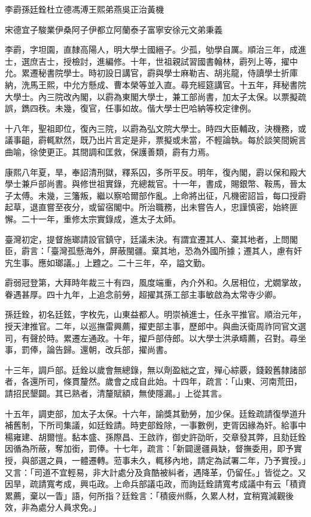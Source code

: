 
\begin{pinyinscope}
李霨孫廷銓杜立德馮溥王熙弟燕吳正治黃機

宋德宜子駿業伊桑阿子伊都立阿蘭泰子富寧安徐元文弟秉義

李霨，字坦園，直隸高陽人，明大學士國縉子。少孤，劬學自厲。順治三年，成進士，選庶吉士，授檢討，進編修。十年，世祖親試習國書翰林，霨列上等，擢中允。累遷秘書院學士。時初設日講官，霨與學士麻勒吉、胡兆龍，侍讀學士折庫納，洗馬王熙，中允方懸成、曹本榮等並入直。尋充經筵講官。十五年，拜秘書院大學士。內三院改內閣，以霨為東閣大學士，兼工部尚書，加太子太保。以票擬疏誤，鐫四秩。未幾，復官，任事如故。偕大學士巴哈納等校定律例。

十八年，聖祖即位，復內三院，以霨為弘文院大學士。時四大臣輔政，決機務，或議事齟，霨輒默然，既乃出片言定是非，票擬或未當，不輕論執。每於談笑間婉言曲喻，徐使更正。其間調和匡救，保護善類，霨有力焉。

康熙八年夏，旱，奉詔清刑獄，釋系囚，多所平反。明年，復內閣，霨以保和殿大學士兼戶部尚書。與修世祖實錄，充總裁官。十一年，書成，賜銀幣、鞍馬，晉太子太傅。未幾，三籓叛，繼以察哈爾部作亂。上命將出征，凡機密詔旨，每口授霨起草，退直嘗至夜分，或留宿閣中。所治職務，出未嘗告人，忠謹慎密，始終匪懈。二十一年，重修太宗實錄成，進太子太師。

臺灣初定，提督施瑯請設官鎮守，廷議未決。有謂宜遷其人、棄其地者，上問閣臣，霨言：「臺灣孤懸海外，屏蔽閩疆。棄其地，恐為外國所據；遷其人，慮有奸宄生事。應如瑯議。」上韙之。二十三年，卒，謚文勤。

霨弱冠登第，大拜時年裁三十有四，風度端重，內介外和。久居相位，尤嫺掌故，眷遇甚厚。四十九年，上追念前勞，超擢其孫工部主事敏啟為太常寺少卿。

孫廷銓，初名廷鉉，字枚先，山東益都人。明崇禎進士，任永平推官。順治元年，授天津推官。二年，以巡撫雷興薦，擢吏部主事，歷郎中。與曲沃衛周祚同官文選司，有聲於時。累遷左通政。十年，擢戶部侍郎。以大學士洪承疇薦，召對。尋坐事，罰俸，論告歸。還朝，改兵部，擢尚書。

十三年，調戶部。廷銓以歲會無總錄，無以劑盈絀之宜，殫心綜覈，錢穀舊隸諸部者，各還所司，條貫釐然。歲會之成自此始。十四年，疏言：「山東、河南荒田，請招民墾闢。其已熟者，清釐賦額，無使隱漏。」上從其言。

十五年，調吏部，加太子太保。十六年，諭獎其勤勞，加少保。廷銓疏請復學道升補舊制，下所司集議，如廷銓請。時吏部銓除，一事數例，吏胥因緣為奸。給事中楊雍建、胡爾愷。黏本盛、孫際昌、王啟祚，御史許劭昕，交章發其弊，且劾廷銓因循為所蔽，奪加銜，罰俸。十七年，疏言：「新闢邊疆員缺，督撫委用，即予實授，與部選之員，一體遷轉。蒞事未久，輒移內地，請定為試署二年，乃予實授。」又言：「司道不宜輕易，非大計處分及貪酷被糾者，遇降革，仍留任。」皆從之。又因旱，疏請寬考成，興屯政。上命兵部議屯政，而詢廷銓請寬考成議中有云「積資累薦，棄以一眚」語，何所指？廷銓言：「積疲州縣，久累人材，宜稍寬減觀後效，非為處分人員求免。」


\end{pinyinscope}
